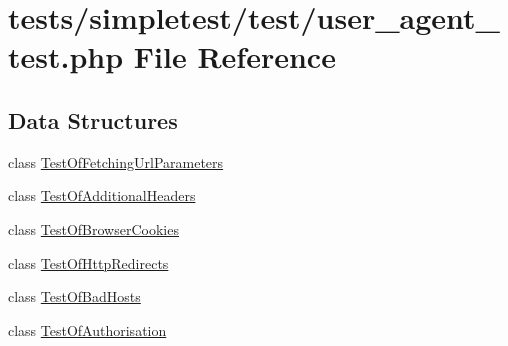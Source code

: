 \hypertarget{user__agent__test_8php}{\section{tests/simpletest/test/user\-\_\-agent\-\_\-test.php File Reference}
\label{user__agent__test_8php}
}
\subsection*{Data Structures}
\begin{DoxyCompactItemize}
\item 
class \hyperlink{class_test_of_fetching_url_parameters}{Test\-Of\-Fetching\-Url\-Parameters}
\item 
class \hyperlink{class_test_of_additional_headers}{Test\-Of\-Additional\-Headers}
\item 
class \hyperlink{class_test_of_browser_cookies}{Test\-Of\-Browser\-Cookies}
\item 
class \hyperlink{class_test_of_http_redirects}{Test\-Of\-Http\-Redirects}
\item 
class \hyperlink{class_test_of_bad_hosts}{Test\-Of\-Bad\-Hosts}
\item 
class \hyperlink{class_test_of_authorisation}{Test\-Of\-Authorisation}
\end{DoxyCompactItemize}
